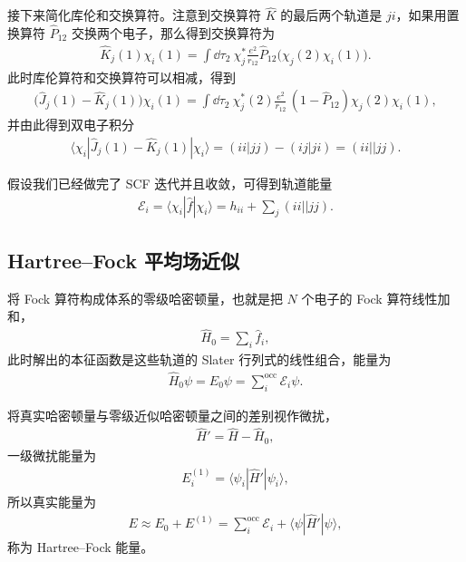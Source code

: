 接下来简化库伦和交换算符。注意到交换算符 $\hat K$ 的最后两个轨道是 $ji$，如果用置换算符 $\hat P_{12}$ 交换两个电子，那么得到交换算符为
\begin{align}
    \hat K_j(1) \chi_i(1) = \int\dd\tau_2 \ \chi_j^* \frac{e^2}{r_{12}} \hat P_{12} \bigl(\chi_j(2)\chi_i(1)\bigr).
\end{align}
此时库伦算符和交换算符可以相减，得到
\begin{align}
    \bigl(\hat J_j(1) - \hat K_j(1)\bigr) \chi_i(1) = 
    \int\dd\tau_2 \ \chi_j^*(2) \frac{e^2}{r_{12}} \, (1-\hat P_{12}) 
    \chi_j(2) \chi_i(1),
\end{align}
并由此得到双电子积分
\begin{align}
    \langle \chi_i | \hat J_j(1) - \hat K_j(1) | \chi_i \rangle =
    (ii|jj) - (ij|ji) = (ii||jj). 
\end{align}

假设我们已经做完了 SCF 迭代并且收敛，可得到轨道能量
\begin{align}
    \mathcal{E}_i = \langle \chi_i | \hat f | \chi_i \rangle 
    = h_{ii} + \sum_j (ii||jj). 
\end{align}

\subsection{Hartree--Fock 平均场近似}
将 Fock 算符构成体系的零级哈密顿量，也就是把 $N$ 个电子的 Fock 算符线性加和，
\begin{align}
    \hat H_0 = \sum_i \hat f_i,
\end{align}
此时解出的本征函数是这些轨道的 Slater 行列式的线性组合，能量为
\begin{align}
    \hat H_0 \psi = E_0 \psi = \sum_i^{\text{occ}} \mathcal{E}_i\psi. 
\end{align}

将真实哈密顿量与零级近似哈密顿量之间的差别视作微扰，
\begin{align}
    \hat H' = \hat H - \hat H_0,
\end{align}
一级微扰能量为
\begin{align}
    E_i^{(1)} = \langle \psi_i | \hat H' | \psi_i \rangle,
\end{align}
所以真实能量为
\begin{align}
    E \approx E_0 + E^{(1)} = \sum_i^{\text{occ}} \mathcal{E}_i + \langle \psi | \hat H' | \psi \rangle,
\end{align}
称为 Hartree--Fock 能量。

